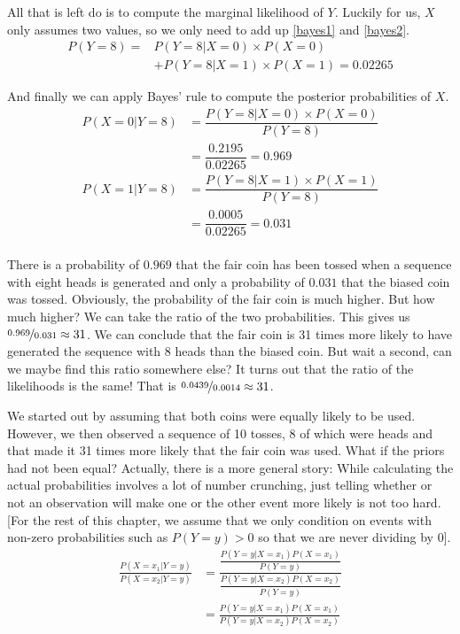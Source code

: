 All that is left do is to compute the marginal likelihood of $ Y $. Luckily for us, $ X $ only assumes two
values, so we only need to add up \eqref{bayes1} and \eqref{bayes2}.
\begin{align}
P(Y=8) = &P(Y=8|X=0) \times P(X=0) \\
&+ P(Y=8|X=1) \times P(X=1) = 0.02265 \nonumber
\end{align}

And finally we can apply Bayes' rule to compute the posterior probabilities of $ X $.
\begin{align}
P(X=0|Y=8) &= \dfrac{P(Y=8|X=0) \times P(X=0)}{P(Y=8)} \\
&= \dfrac{0.2195}{0.02265} = 0.969 \nonumber \\
P(X=1|Y=8) &= \dfrac{P(Y=8|X=1) \times P(X=1)}{P(Y=8)} \\
&= \dfrac{0.0005}{0.02265} = 0.031 \nonumber \\
\end{align}

There is a probability of $ 0.969 $ that the fair coin has been tossed when a sequence with eight heads is
generated and only a probability of $ 0.031 $ that the biased coin was tossed. Obviously, the probability of the fair 
coin is much higher. But how much higher? We can take the ratio of the two probabilities. This gives us 
$ \nicefrac{0.969}{0.031} \approx 31 $. We can conclude that the fair coin is 31 times more likely to have generated the sequence with
8 heads than the biased coin. But wait a second, can we maybe find this ratio somewhere else? It turns out that 
the ratio of the likelihoods is the same! That is $ \nicefrac{0.0439}{0.0014} \approx 31 $.

We started out by assuming that both coins were equally likely to be used. However, we then observed a sequence of 10 tosses, 8 of 
which were heads and that made it 31 times more likely that the fair coin was used. What if the priors had not been equal?
Actually, there is a more general story: While calculating the actual probabilities involves a lot of number crunching, just telling whether or not an observation will make one or the other event more likely is not too hard. [For the rest of this chapter, we assume that we only condition on events with non-zero probabilities such as $P(Y=y)>0$ so that we are never dividing by 0].
\begin{align*}
\frac{P(X=x_{1}|Y=y)}{P(X=x_{2}|Y=y)} &= \frac{\dfrac{P(Y=y|X=x_{1})P(X=x_{1})}{P(Y=y)}}{\dfrac{P(Y=y|X=x_{2})P(X=x_{2})}{P(Y=y)}} \\[1em]
&= \frac{P(Y=y|X=x_{1})P(X=x_{1})}{P(Y=y|X=x_{2})P(X=x_{2})}
\end{align*}

